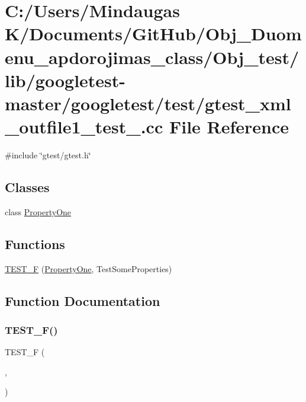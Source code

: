 \hypertarget{_obj__test_2lib_2googletest-master_2googletest_2test_2gtest__xml__outfile1__test___8cc}{}\section{C\+:/\+Users/\+Mindaugas K/\+Documents/\+Git\+Hub/\+Obj\+\_\+\+Duomenu\+\_\+apdorojimas\+\_\+class/\+Obj\+\_\+test/lib/googletest-\/master/googletest/test/gtest\+\_\+xml\+\_\+outfile1\+\_\+test\+\_\+.cc File Reference}
\label{_obj__test_2lib_2googletest-master_2googletest_2test_2gtest__xml__outfile1__test___8cc}
{\ttfamily \#include \char`\"{}gtest/gtest.\+h\char`\"{}}\newline
\subsection*{Classes}
\begin{DoxyCompactItemize}
\item 
class \mbox{\hyperlink{class_property_one}{Property\+One}}
\end{DoxyCompactItemize}
\subsection*{Functions}
\begin{DoxyCompactItemize}
\item 
\mbox{\hyperlink{_obj__test_2lib_2googletest-master_2googletest_2test_2gtest__xml__outfile1__test___8cc_a332e6b360a7975e161b4f4b1e34e2d33}{T\+E\+S\+T\+\_\+F}} (\mbox{\hyperlink{class_property_one}{Property\+One}}, Test\+Some\+Properties)
\end{DoxyCompactItemize}


\subsection{Function Documentation}
\mbox{\label{_obj__test_2lib_2googletest-master_2googletest_2test_2gtest__xml__outfile1__test___8cc_a332e6b360a7975e161b4f4b1e34e2d33}} 
\subsubsection{\texorpdfstring{TEST\_F()}{TEST\_F()}}
{\footnotesize\ttfamily T\+E\+S\+T\+\_\+F (\begin{DoxyParamCaption}\item[{\mbox{\hyperlink{class_property_one}{Property\+One}}}]{,  }\item[{Test\+Some\+Properties}]{ }\end{DoxyParamCaption})}

